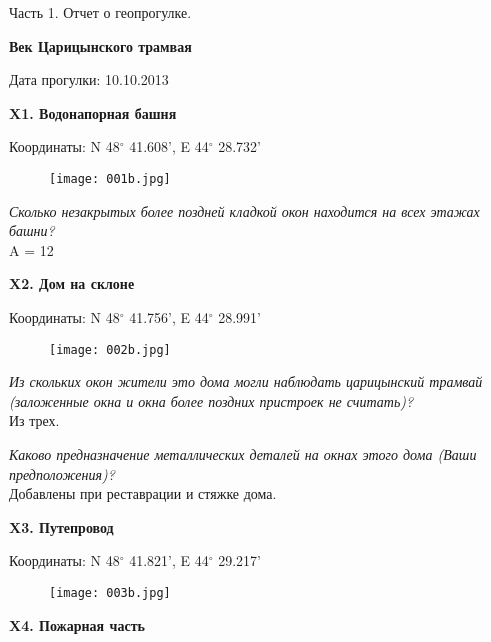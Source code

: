 \documentclass[pscyr,titlepage]{hedreport}
\begin{document}
  \maketitle
  \begin{center}
    \large Часть 1. Отчет о геопрогулке.

    \bf Век Царицынского трамвая
  \end{center}
  \begin{flushright}
    Дата прогулки: 10.10.2013
  \end{flushright}

  \textbf{X1. Водонапорная башня}

  Координаты: N 48\( ^\circ \) 41.608', E 44\( ^\circ \) 28.732'

  \begin{figure}[htbp]
    \center
    \texttt{[image: 001b.jpg]}
  \end{figure}

  \emph{Сколько незакрытых более поздней кладкой окон находится на всех
  этажах башни?} \\
  A = 12

  \pagebreak

  \textbf{X2. Дом на склоне}

  Координаты: N 48\( ^\circ \) 41.756', E 44\( ^\circ \) 28.991'

  \begin{figure}[htbp]
    \center
    \texttt{[image: 002b.jpg]}
  \end{figure}

  \emph{Из скольких окон жители это дома могли наблюдать царицынский трамвай
  (заложенные окна и окна более поздних пристроек не считать)?} \\
  Из трех.

  \emph{Каково предназначение металлических деталей на окнах этого дома
  (Ваши предположения)?} \\
  Добавлены при реставрации и стяжке дома.

  \pagebreak

  \textbf{X3. Путепровод}

  Координаты: N 48\( ^\circ \) 41.821', E 44\( ^\circ \) 29.217'

  \begin{figure}[htbp]
    \center
    \texttt{[image: 003b.jpg]}
  \end{figure}

  \pagebreak

  \textbf{X4. Пожарная часть}
\end{document}
